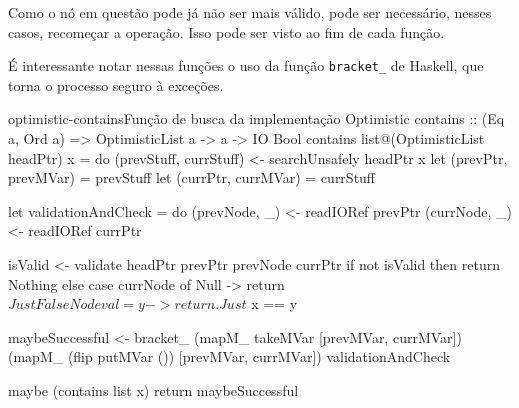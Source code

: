 \documentclass[a4paper,12pt,oldfontcommands]{abntex2}
\begin{document}
Como o nó em questão pode já não ser mais válido, pode ser necessário, nesses casos, recomeçar a operação. Isso pode ser visto ao fim de cada função.


É interessante notar nessas funções o uso da função \texttt{bracket\_} de Haskell, que torna o processo seguro à exceções.

\begin{code}{optimistic-contains}{Função de busca da implementação Optimistic}
contains :: (Eq a, Ord a) => OptimisticList a -> a -> IO Bool
contains list@(OptimisticList headPtr) x = do
    (prevStuff, currStuff) <- searchUnsafely headPtr x
    let (prevPtr, prevMVar) = prevStuff
    let (currPtr, currMVar) = currStuff

    let
        validationAndCheck = do
            (prevNode, _) <- readIORef prevPtr
            (currNode, _) <- readIORef currPtr

            isValid <- validate headPtr prevPtr prevNode currPtr
            if not isValid then return Nothing
            else case currNode of
                Null -> return $ Just False
                Node { val = y } -> return . Just $ x == y

    maybeSuccessful <- bracket_
        (mapM_ takeMVar [prevMVar, currMVar])
        (mapM_ (flip putMVar ()) [prevMVar, currMVar])
        validationAndCheck

    maybe (contains list x) return maybeSuccessful
\end{code}
\end{document}
